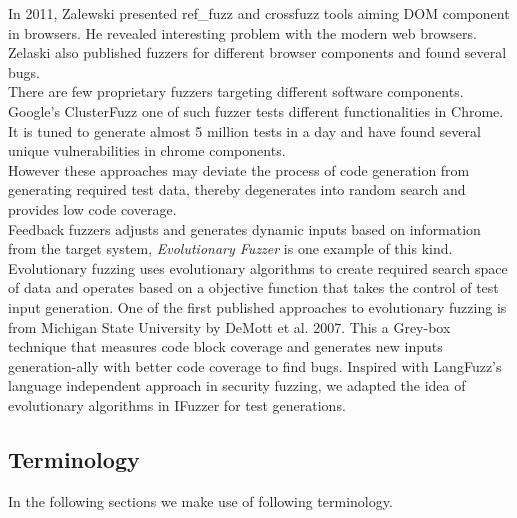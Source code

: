 \documentclass{acm_proc_article-sp}
\begin{document}
\indent In 2011, Zalewski presented ref\_fuzz \cite{Zelaski08} and cross\-fuzz \cite{Zelaski11} tools aiming DOM component in browsers. He revealed interesting problem with the modern web browsers. Zelaski also published fuzzers for different browser components and found several bugs.\\
\indent There are few proprietary fuzzers targeting different software components. Google's ClusterFuzz \cite{Arya12} one of such fuzzer tests different functionalities in Chrome. It is tuned to generate almost 5 million tests in a day and have found several unique vulnerabilities in chrome components.\\
\indent However these approaches may deviate the process of code generation from generating required test data, thereby degenerates into random search and provides low code coverage.\\ 
\indent Feedback fuzzers adjusts and generates dynamic inputs based on information from the target system, \textit{Evolutionary Fuzzer} is one example of this kind. Evolutionary fuzzing uses evolutionary algorithms to create required search space of data and operates based on a objective function that takes the control of test input generation. One of the first published approaches to evolutionary fuzzing \cite{demott2007} is from Michigan State University by DeMott et al. 2007. This a Grey-box technique that measures code block coverage and generates new inputs generation-ally with better code coverage to find bugs. Inspired with LangFuzz's language independent approach in security fuzzing, we adapted the idea of evolutionary algorithms in IFuzzer for test generations.

\subsection{Terminology}
In the following sections we make use of following terminology.
\end{document}
